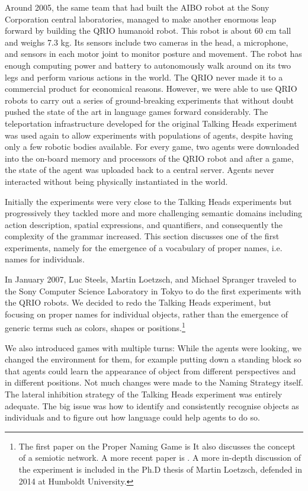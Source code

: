 Around 2005, the same team that had built the AIBO robot at the Sony Corporation central laboratories, managed to 
make another enormous leap forward by building 
the QRIO humanoid robot. This robot is about 60 cm tall and weighs 7.3 kg. Its sensors
include two cameras in the head, a microphone, and sensors in each motor joint to monitor posture and movement. The robot has enough
computing power and battery to autonomously walk around on its two legs and perform various actions in the world.
The QRIO never made it to a commercial product for economical reasons. However, we were able to use QRIO robots to 
carry out a series of ground-breaking experiments that without doubt pushed the state of the art in language games
forward considerably. 
The teleportation infrastructure developed for the original Talking Heads experiment was used again 
to allow experiments with populations of agents, despite having only a few robotic bodies available. 
For every game, two agents were downloaded into the on-board memory and processors 
of the QRIO robot and after a game, the state of the agent was uploaded back to a central server. Agents never
interacted without being physically instantiated in the world. 

Initially the experiments were very close to the Talking Heads experiments but progressively 
they tackled more and more challenging semantic domains
including action description, spatial expressions, and quantifiers, and consequently
the complexity of the grammar increased. This section discusses one of the first experiments, namely 
for the emergence of a vocabulary of proper names, i.e. names for individuals.

In January 2007, Luc Steels, Martin Loetzsch, and Michael Spranger traveled to the Sony Computer Science Laboratory 
in Tokyo to do the first experiments with the QRIO robots.  
We decided to redo the Talking Heads experiment, but focusing on proper names for individual objects, rather than the emergence 
of generic terms such as colors, shapes or positions.\footnote{The first paper on the Proper Naming Game is \cite{Steels:2007}
It also discusses the concept of a semiotic network. 
A more recent paper is \cite{Steels:2012b}. A more 
in-depth discussion of the experiment is included 
in the Ph.D thesis of Martin Loetzsch, defended in 2014 at Humboldt University.}

We also introduced games with multiple turns: While the agents were looking, we 
changed the environment for them, for example putting down a standing block so that 
agents could learn the appearance of object from different perspectives and in different positions. 
Not much changes were made to the Naming Strategy itself. The 
lateral inhibition strategy of the Talking Heads experiment was entirely adequate. The big issue was how to 
identify and consistently recognise objects as individuals and to figure out how language could help agents to do so. 

